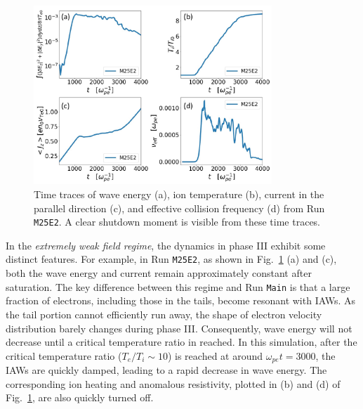 \documentclass[%
 reprint,
 amsmath,
 amssymb,
 aps,
 prx,
floatfix,
superscriptaddress
]{revtex4-2}
\begin{document}
\begin{figure}[!htbp]
\includegraphics[width=0.8\textwidth]{Fig_app_5.pdf}
\caption{Time traces of wave energy (a), ion temperature (b), current in the parallel direction (c), and effective collision frequency (d) from Run {\tt M25E2}. A clear shutdown moment is visible from these time traces.}
\label{sup:fig:extreme}
\end{figure}


In the {\it extremely weak field regime}, the dynamics in phase III exhibit some distinct features. 
For example, in Run {\tt M25E2}, as shown in Fig.~\ref{sup:fig:extreme} (a) and (c), both the wave energy and current remain approximately constant after saturation. 
The key difference between this regime and Run {\tt Main} is that a large fraction of electrons, including those in the tails, become resonant with IAWs. As the tail portion cannot efficiently run away, the shape of electron velocity distribution barely changes during phase III.
Consequently, wave energy will not decrease until a critical temperature ratio in reached.
In this simulation, after the critical temperature ratio ($T_e/T_i \sim 10$) is reached at around $\omega_{pe}t = 3000$, the IAWs are quickly damped, leading to a rapid decrease in wave energy. 
The corresponding ion heating and anomalous resistivity, plotted in (b) and (d) of Fig.~\ref{sup:fig:extreme}, are also quickly turned off.



\newpage


\end{document}
